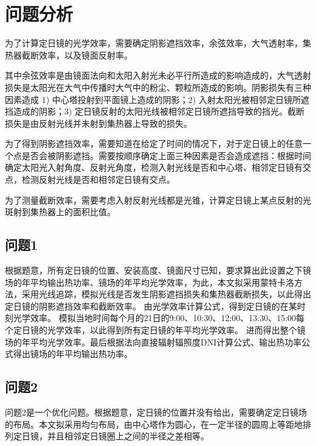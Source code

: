 \section{问题分析}
为了计算定日镜的光学效率，需要确定阴影遮挡效率，余弦效率，大气透射率，集热器截断效率，以及镜面反射率。

其中余弦效率是由镜面法向和太阳入射光未必平行所造成的影响造成的，大气透射损失是太阳光在大气中传播时大气中的粉尘、颗粒所造成的影响。阴影损失有三种因素造成 1) 中心塔投射到平面镜上造成的阴影；2) 入射太阳光被相邻定日镜所遮挡造成的阴影；3) 定日镜反射的太阳光线被相邻定日镜所遮挡导致的挡光。截断损失是由反射光线并未射到集热器上导致的损失。

为了得到阴影遮挡效率，需要知道在给定了时间的情况下，对于定日镜上的任意一个点是否会被阴影遮挡。需要按顺序确定上面三种因素是否会造成遮挡：根据时间确定太阳光入射角度、反射光角度，检测入射光线是否和中心塔、相邻定日镜有交点，检测反射光线是否和相邻定日镜有交点。

为了测量截断效率，需要考虑入射反射光线都是光锥，计算定日镜上某点反射的光斑射到集热器上的面积比值。
\subsection{问题1}
根据题意，所有定日镜的位置、安装高度、镜面尺寸已知，要求算出此设置之下镜场的年平均输出热功率、镜场的年平均光学效率，为此，本文拟采用蒙特卡洛方法，采用光线追踪，模拟光线是否发生阴影遮挡损失和集热器截断损失，以此得出定日镜的阴影遮挡效率和截断效率。
由光学效率计算公式，得到定日镜的在某时刻光学效率。
模拟当地时间每个月的21日的9:00、10:30、12:00、13:30、15:00每个定日镜的光学效率，以此得到所有定日镜的年平均光学效率。
进而得出整个镜场的年平均光学效率。最后根据法向直接辐射辐照度DNI计算公式、输出热功率公式得出镜场的年平均输出热功率。
\subsection{问题2}
问题2是一个优化问题。根据题意，定日镜的位置并没有给出，需要确定定日镜场的布局。本文拟采用均匀布局，由中心塔作为圆心，在一定半径的圆周上等距地排列定日镜，并且相邻定日镜圈上之间的半径之差相等。
